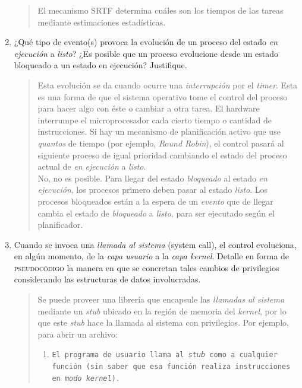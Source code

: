 \documentclass[a4paper,10pt,spanish]{article}
\begin{document}
\begin{enumerate}[1.]
\begin{quote}
El mecanismo SRTF determina cuáles son los tiempos de las tareas mediante estimaciones estadísticas.
\end{quote}

\item ¿Qué tipo de evento(s) provoca la evolución de un proceso del estado \textit{en ejecución} a \textit{listo}? ¿Es posible que un proceso evolucione desde un estado bloqueado a un estado en ejecución? Justifique.

\begin{quote}
Esta evolución se da cuando ocurre una \textit{interrupción} por el \textit{timer}. Esta es una forma de que el sistema operativo tome el control del proceso para hacer algo con éste o cambiar a otra tarea. El hardware interrumpe el microprocesador cada cierto tiempo o cantidad de instrucciones. Si hay un mecanismo de planificación activo que use \textit{quantos} de tiempo (por ejemplo, \textit{Round Robin}), el control pasará al siguiente proceso de igual prioridad cambiando el estado del proceso actual de \textit{en ejecución} a \textit{listo}. \\

No, no es posible. Para llegar del estado \textit{bloqueado} al estado \textit{en ejecución}, los procesos primero deben pasar al estado \textit{listo}. Los procesos bloqueados están a la espera de un \textit{evento} que de llegar cambia el estado de \textit{bloqueado} a \textit{listo}, para ser ejecutado según el planificador.
\end{quote}

\item Cuando se invoca una \textit{llamada al sistema} (system call), el control evoluciona, en algún momento, de la \textit{capa usuario} a la \textit{capa kernel}. Detalle en forma de \textsc{pseudocódigo} la manera en que se concretan tales cambios de privilegios considerando las estructuras de datos involucradas.

\begin{quote}

Se puede proveer una librería que encapsule las \textit{llamadas al sistema} mediante un \textit{stub} ubicado en la región de memoria del \textit{kernel}, por lo que este \textit{stub} hace la llamada al sistema con privilegios. Por ejemplo, para abrir un archivo:

\begin{enumerate}[1.]
\item \texttt{El programa de usuario llama al \textit{stub} como a cualquier función (sin saber que esa función realiza instrucciones en \textit{modo kernel}).}


\end{enumerate}
\end{quote}
\end{enumerate}
\end{document}
